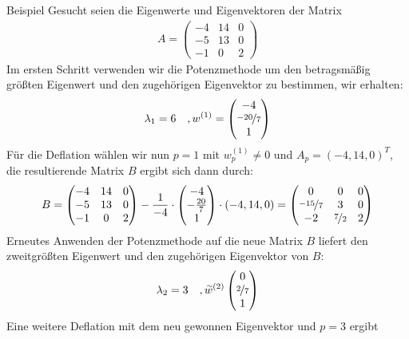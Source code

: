 \begin{colboxBreakable}{Beispiel}
  Gesucht seien die Eigenwerte und Eigenvektoren der Matrix
  \begin{align*}
    A = \begin{pmatrix}
    -4 & 14 & 0 \\ -5 & 13 & 0 \\ -1 & 0 & 2
    \end{pmatrix}
  \end{align*}
  Im ersten Schritt verwenden wir die Potenzmethode um den betragsmäßig größten Eigenwert und den zugehörigen
  Eigenvektor zu bestimmen, wir erhalten:
  \begin{align*}
  \lambda_1=6 \quad, w^{(1)}=\begin{pmatrix}
      -4 \\ \nicefrac{-20}{7} \\ 1
    \end{pmatrix}
  \end{align*}
  Für die Deflation wählen wir nun $p=1$ mit $w_p^{(1)}\neq 0$ und $A_p=(-4, 14, 0)^T$, die resultierende Matrix $B$
  ergibt sich dann durch:
  \begin{align*}
  B = \begin{pmatrix}
    -4 & 14 & 0 \\ -5 & 13 & 0 \\ -1 & 0 & 2
  \end{pmatrix} - \dfrac{1}{-4}\cdot\begin{pmatrix}
    -4 \\ -\tfrac{20}{7} \\ 1
  \end{pmatrix}\cdot(-4, 14, 0) = \begin{pmatrix}
    0 & 0 & 0 \\ \nicefrac{-15}{7} & 3 & 0 \\ -2 & \nicefrac{7}{2} & 2
  \end{pmatrix}
  \end{align*}
  Erneutes Anwenden der Potenzmethode auf die neue Matrix $B$ liefert den zweitgrößten Eigenwert und den
  zugehörigen Eigenvektor von $B$:
  \begin{align*}
    \lambda_2=3 \quad, \accentset{\sim}{w}^{(2)}\begin{pmatrix}
      0 \\ \nicefrac{2}{7} \\ 1
    \end{pmatrix}
  \end{align*}
  Eine weitere Deflation mit dem neu gewonnen Eigenvektor und $p=3$ ergibt

\end{colboxBreakable}

